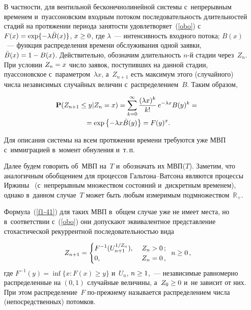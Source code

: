 \begin{multicols}{2}
В частности, для вентильной бесконечнолинейной сис\-те\-мы с~непрерывным временем
и~пуассоновским входным потоком последовательность длительностей стадий
на протяжении периода за\-ня\-тости удовле\-тво\-ря\-ет~(\ref{obo}) с~$F(x)\hm=\exp\{-\lambda
{\bar B}(x)\}$, $x\hm\ge 0$,
где $\lambda$~--- ин\-тен\-сив\-ность входного потока; $B(x)$~---
функция распределения времени обслуживания одной заявки,
${\bar B}(x)\hm=1\hm-B(x)$.
Действительно,
обозначим дли\-тель\-ность $n$-й стадии через~$Z_n$. При условии $Z_n\hm=x$
чис\-ло заявок, по\-сту\-пив\-ших на данной стадии, пуассоновское с~па\-ра\-мет\-ром~$\lambda x$, 
а~$Z_{n+1}$ есть максимум этого (случайного) числа
независимых случайных величин с~распределением~$B$. Таким образом,

\noindent
\begin{multline*}
{\bf P}(Z_{n+1}\le y|Z_n=x)=
\sum\limits_{k=0}^\infty\displaystyle\frac{\displaystyle (\lambda x)^k\mathstrut}{\displaystyle k!\mathstrut}\,e^{-\lambda x}B(y)^k={}\\
{}=
\exp\left\{-\lambda x {\bar B}(y)\right\}=F(y)^x.
\end{multline*}

Для описания сис\-те\-мы на всем протяжении времени требуются уже МВП
с~иммиграцией в~момент обнуления и~т.\,п.~\cite[\S\ 4.3]{LebDiss}

Далее будем говорить об~МВП
на~$T$ и~обозначать их МВП($T$). Заметим, что аналогичным обобщением
для процессов Галь\-тон\-а--Ват\-со\-на являются процессы Иржины~\cite{Jr2}
(с~непрерывным множеством со\-сто\-яний и~дискретным временем), 
однако в~данном случае~$T$ может быть любым измеримым подмножеством~$\mathbb{R}_+$.

Формула~(\ref{f1-41}) для таких МВП в~общем случае уже не имеет мес\-та,
но в~соответствии с~(\ref{obo}) они допускают эквивалентное
пред\-став\-ле\-ние стохастической рекуррентной последовательностью вида

\noindent
\begin{equation*}
Z_{n+1}=\begin{cases}
\displaystyle
F^{-1}(U_{n+1}^{1/Z_n}),&\ Z_n>0\,;\\
\displaystyle
0,&\ Z_n=0\,,\end{cases}\enskip n\ge 0\,,
\end{equation*}
где $F^{-1}(y)=\inf\{x: F(x)\ge y\}$ и~$U_n$, $n\hm\ge 1$,~---
независимые равномерно распределенные на $(0,1)$ случайные величины,
а~$Z_0\hm\ge 0$ и~не зависит от них. При этом распределение~$F$
по-преж\-не\-му называется распределением чис\-ла (непосредственных) потомков.


\end{multicols}
